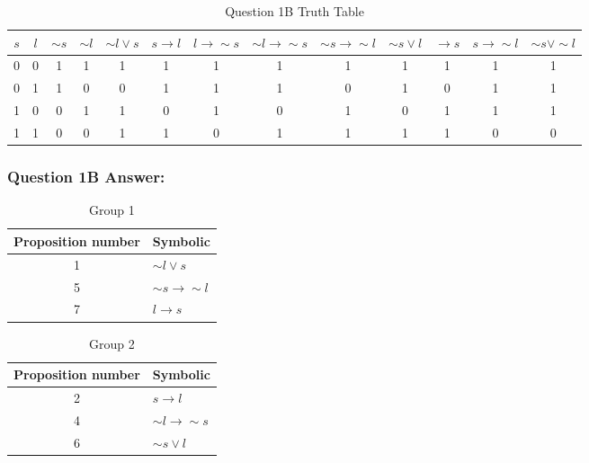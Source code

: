 \documentclass[12pt,a4paper]{article}
\begin{document}
\newpage
\begin{landscape}
\thispagestyle{fancylscape}
\begin{table}[h]
\centering
\caption{Question 1B Truth Table}
\begin{tabular}{c|c|c|c|c|c|c|c|c|c|c|c|c}
$s$ & $l$ & $\sim{s}$ & $\sim{l}$ & $\sim{l} \vee s$ & $s \rightarrow l$ & $l \rightarrow \sim{s}$ & $\sim{l} \rightarrow \sim{s}$ & $\sim{s} \rightarrow \sim{l}$ & $\sim{s} \vee l$ & $ \rightarrow s$ & $s \rightarrow \sim{l}$ & $\sim{s} \vee \sim{l}$ \\
\hline
0 & 0 & 1 & 1 & 1 & 1 & 1 & 1 & 1 & 1 & 1 & 1 & 1 \\
\hline
0 & 1 & 1 & 0 & 0 & 1 & 1 & 1 & 0 & 1 & 0 & 1 & 1 \\
\hline
1 & 0 & 0 & 1 & 1 & 0 & 1 & 0 & 1 & 0 & 1 & 1 & 1 \\
\hline
1 & 1 & 0 & 0 & 1 & 1 & 0 & 1 & 1 & 1 & 1 & 0 & 0 \\
\hline
\end{tabular}
\end{table}
\end{landscape}

\newpage
\subsubsection{Question 1B Answer:}

\begin{table}[h]
\centering
\caption{Group 1}
\begin{tabular}{c|l}
Proposition number & Symbolic \\
\hline
1 & $\sim{l} \vee s$\\
\hline
5 & $\sim{s} \rightarrow \sim{l}$\\
\hline
7 & $l \rightarrow s$\\
\hline
\end{tabular}
\end{table}

\begin{table}[h]
\centering
\caption{Group 2}
\begin{tabular}{c|l}
Proposition number & Symbolic \\
\hline
2 & $s \rightarrow l$ \\
\hline
4 & $\sim{l} \rightarrow \sim{s}$ \\
\hline
6 & $\sim{s} \vee l$ \\
\end{tabular}
\end{table}
\end{document}
